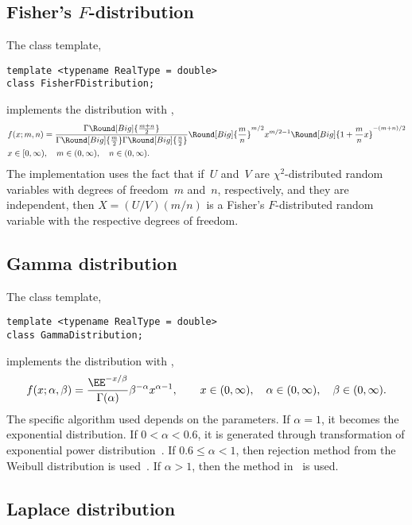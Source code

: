 \subsection{Fisher's \texorpdfstring{$F$}{F}-distribution}
\label{sub:Fisher's F-distribution}

The class template,
\begin{verbatim}
template <typename RealType = double>
class FisherFDistribution;
\end{verbatim}
implements the distribution with \pdf,
\begin{align*}
  & f(x;m,n) =
  \frac{\Gamma\Round[Big]{\frac{m + n}{2}}}{
    \Gamma\Round[Big]{\frac{m}{2}}\Gamma\Round[Big]{\frac{n}{2}}}
  \Round[Big]{\frac{m}{n}}^{m/2} x^{m / 2 - 1}
  \Round[Big]{1 + \frac{m}{n}x}^{-(m + n) / 2} \\
  & x \in [0, \infty),\quad m \in (0, \infty),\quad n \in (0, \infty).
\end{align*}
The implementation uses the fact that if~$U$ and~$V$ are $\chi^2$-distributed
random variables with degrees of freedom~$m$ and~$n$, respectively, and they
are independent, then $X = (U / V)(m / n)$ is a Fisher's $F$-distributed random
variable with the respective degrees of freedom.

\subsection{Gamma distribution}
\label{sub:Gamma distribution}

The class template,
\begin{verbatim}
template <typename RealType = double>
class GammaDistribution;
\end{verbatim}
implements the distribution with \pdf,
\begin{equation*}
  f(x;\alpha,\beta) =
  \frac{\EE^{-x/\beta}}{\Gamma(\alpha)}\beta^{-\alpha}x^{\alpha-1},\qquad
  x \in (0, \infty),\quad \alpha \in (0, \infty),\quad \beta \in (0, \infty).
\end{equation*}
The specific algorithm used depends on the parameters. If $\alpha = 1$, it
becomes the exponential distribution. If $0 < \alpha < 0.6$, it is generated
through transformation of exponential power
distribution~\cite[sec~2.6]{Devroye:1986gi}. If $0.6\le\alpha<1$, then
rejection method from the Weibull distribution is
used~\cite[sec.~3.4]{Devroye:1986gi}. If $\alpha > 1$, then the method
in~\cite{Marsaglia:2000vq} is used.

\subsection{Laplace distribution}
\label{sub:Laplace distribution}

